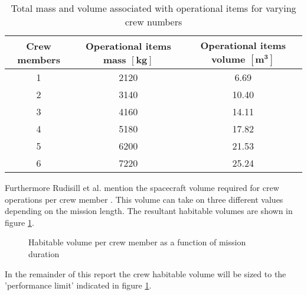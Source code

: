 \begin{table}[h]
	\centering
	\caption[Total mass and volume associated with operational items]{Total mass and volume associated with operational items for varying crew numbers}
	\begin{tabular}{|c|c|c|}
		\hline
		\textbf{Crew members} & \textbf{Operational items mass $\mathbf{[kg]}$} & \textbf{Operational items volume $\mathbf{[m^{3}]}$}\\ \hline \hline
		1 & 2120 & 6.69\\
		2 & 3140 & 10.40\\
		3 & 4160 & 14.11\\
		4 & 5180 & 17.82\\
		5 & 6200 & 21.53\\
		6 & 7220 & 25.24\\ \hline
	\end{tabular}
	\label{tab:crewmemberops}
\end{table}
Furthermore Rudisill et al. mention the spacecraft volume required for crew operations per crew member \cite{Rudisill2008}. This volume can take on three different values depending on the mission length. The resultant habitable volumes are shown in figure \ref{fig:crewvolume}.
\begin{figure}[h]
	\centering
	\setlength{} 
	\setlength{}
	
	\caption[Habitable volume per crew member as a function of mission duration]{Habitable volume per crew member as a function of mission duration \cite{Rudisill2008}}
	\label{fig:crewvolume}
\end{figure}
In the remainder of this report the crew habitable volume will be sized to the 'performance limit' indicated in figure \ref{fig:crewvolume}.
